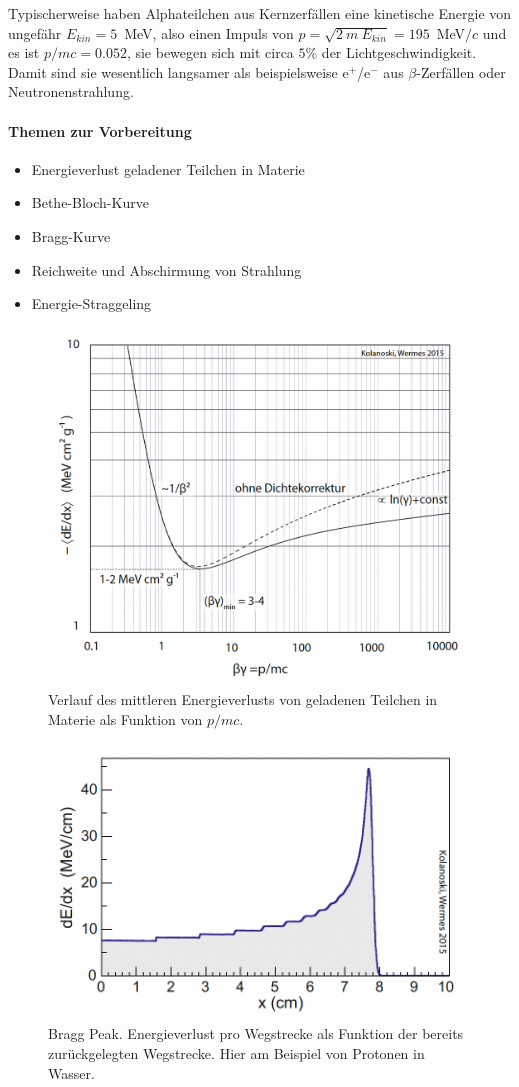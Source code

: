 Typischerweise haben Alphateilchen aus Kernzerfällen eine kinetische Energie von ungefähr 
$E_{kin} = 5$~MeV, also einen Impuls von $ p = \sqrt{2 \ m \ E_{kin} } = 195$~MeV$/c$ und es ist $p/mc = 0.052$, sie bewegen sich mit circa $5\%$ der Lichtgeschwindigkeit.
Damit sind sie wesentlich langsamer als beispielsweise e$^+$/e$^-$ aus $\beta$-Zerfällen oder Neutronenstrahlung.

\paragraph{Themen zur Vorbereitung}
\begin{itemize}
	\item Energieverlust geladener Teilchen in Materie
	\item Bethe-Bloch-Kurve
	\item Bragg-Kurve
	\item Reichweite und Abschirmung von Strahlung
	\item Energie-Straggeling
\end{itemize}

%
\begin{figure}[h]
	\centering
	\includegraphics[width=0.7\linewidth]{img/bethe_curve.png}
	\caption{Verlauf des mittleren Energieverlusts von geladenen Teilchen in Materie als Funktion von $p/mc$. \cite{kolanoski} }
	\label{fig:bethecurve}
\end{figure}
%
%
\begin{figure}[h]
	\centering
	\includegraphics[width=0.7\linewidth]{img/bragg_peak.png}
	\caption{Bragg Peak. Energieverlust pro Wegstrecke als Funktion der bereits zurückgelegten Wegstrecke. Hier am Beispiel von Protonen in Wasser. \cite{kolanoski}}
	\label{fig:braggpeak}
\end{figure}
\FloatBarrier
%
